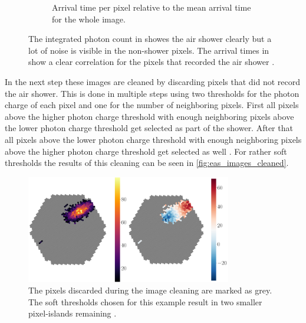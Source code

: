 \begin{figure}
\begin{subfigure}{0.49\textwidth}
        \caption{Arrival time per pixel relative to the mean arrival time for the whole image.}
        \label{fig:eas_image2}
    \end{subfigure}
    \caption{The integrated photon count in  showes the air shower clearly but a lot of noise is visible in the non-shower pixels.
        The arrival times in  show a clear correlation for the pixels that recorded the air shower \cite{lukas}.
    }
    \label{fig:eas_images}
\end{figure}

In the next step these images are cleaned by discarding pixels that did not record the air shower. 
This is done in multiple steps using two thresholds for the photon charge of each pixel and one for the number of neighboring pixels.
First all pixels above the higher photon charge threshold with enough neighboring pixels above the lower photon charge threshold get selected as part of the shower.
After that all pixels above the lower photon charge threshold with enough neighboring pixels above the higher photon charge threshold get selected as well \cite{lukas}.
For rather soft thresholds the results of this cleaning can be seen in \autoref{fig:eas_images_cleaned}.
\begin{figure}
    \centering
    \includegraphics[width=0.8\textwidth]{images/eas_images_cleaned.png}
    \caption{The pixels discarded during the image cleaning are marked as grey. The soft thresholds chosen for this example result in two smaller pixel-islands remaining \cite{lukas}.}
    \label{fig:eas_images_cleaned}
\end{figure}

